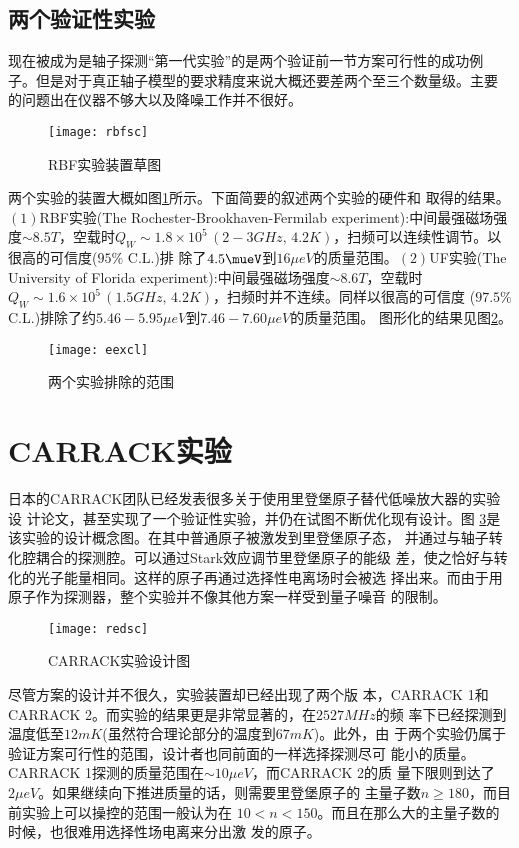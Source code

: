\documentclass[twocolumn,12pt,a4paper]{article}
\begin{document}
\subsection{两个验证性实验}
现在被成为是轴子探测``第一代实验''的是两个验证前一节方案可行性的成功例
子。但是对于真正轴子模型的要求精度来说大概还要差两个至三个数量级。主要
的问题出在仪器不够大以及降噪工作并不很好。\par
\begin{figure}[t]
  \centering
  \texttt{[image: rbfsc]}
  \caption{RBF实验装置草图}
  \label{f:rbf}
\end{figure}
两个实验的装置大概如图\ref{f:rbf}所示。下面简要的叙述两个实验的硬件和
取得的结果。$(1)$RBF实验(The Rochester-Brookhaven-Fermilab
experiment):中间最强磁场强度$\sim 8.5T$，空载时$Q_W \sim 1.8 \times 10^5
\,(2-3GHz,\,4.2K)$，扫频可以连续性调节。以很高的可信度($95\%$ C.L.)排
除了$4.5\mueV$到$16\mu eV$的质量范围\cite{depanfilis87}。$(2)$UF实验(The University of
Florida experiment):中间最强磁场强度$\sim 8.6T$，空载时$Q_W \sim 1.6
\times 10^5 \,(1.5GHz,\,4.2K)$，扫频时并不连续。同样以很高的可信度
($97.5\%$ C.L.)排除了约$5.46-5.95\mu eV$到$7.46-7.60\mu eV$的质量范围\cite{hagmann90}。
图形化的结果见图\ref{f:eexcl}。
\begin{figure}[h]
  \centering
  \texttt{[image: eexcl]}
  \caption{两个实验排除的范围\cite{asztalos01}}
  \label{f:eexcl}
\end{figure}

\section{CARRACK实验}
日本的CARRACK团队已经发表很多关于使用里登堡原子替代低噪放大器的实验设
计论文，甚至实现了一个验证性实验，并仍在试图不断优化现有设计。图
\ref{redsc}是该实验的设计概念图。在其中普通原子被激发到里登堡原子态，
并通过与轴子转化腔耦合的探测腔。可以通过Stark效应调节里登堡原子的能级
差，使之恰好与转化的光子能量相同。这样的原子再通过选择性电离场时会被选
择出来。而由于用原子作为探测器，整个实验并不像其他方案一样受到量子噪音
的限制。\par
\begin{figure}[h!]
  \centering
  \texttt{[image: redsc]}
  \caption{CARRACK实验设计图}
  \label{redsc}
\end{figure}
尽管方案\cite{tada06}的设计并不很久，实验装置却已经出现了两个版
本，CARRACK 1和CARRACK 2。而实验的结果更是非常显著的，在$2527MHz$的频
率下已经探测到温度低至$12mK$(虽然符合理论部分的温度到$67mK$)。此外，由
于两个实验仍属于验证方案可行性的范围，设计者也同前面的一样选择探测尽可
能小的质量。CARRACK 1探测的质量范围在$\sim 10\mu eV$，而CARRACK 2的质
量下限则到达了$2 \mu eV$。如果继续向下推进质量的话，则需要里登堡原子的
主量子数$n\geq 180$，而目前实验上可以操控的范围一般认为在
$10<n<150$。而且在那么大的主量子数的时候，也很难用选择性场电离来分出激
发的原子\cite{asztalos01}\cite{tada06}。
\end{document}
